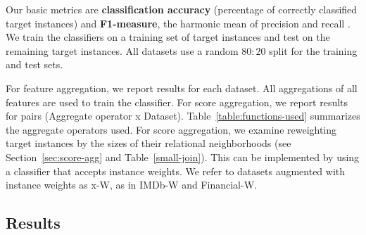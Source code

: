 \documentclass[conference]{IEEEtran}
\begin{document}
%



Our basic metrics are \textbf{classification accuracy} (percentage of correctly classified target instances) and \textbf{F1-measure}, the harmonic mean of precision and recall \cite{Witten2005}. We train the classifiers on a training set of target instances and test on the remaining target instances. All datasets use a random $80:20$ split for the training and test sets.

For feature aggregation, we report results for each dataset. All aggregations of all features are used to train the classifier. For score aggregation, we report results for pairs (Aggregate operator x Dataset). Table~\ref{table:functions-used} summarizes the aggregate operators used.
%
For score aggregation, we examine reweighting target instances by the sizes of their relational neighborhoods (see Section~\ref{sec:score-agg} and Table~\ref{small-join}). This can be %
implemented by using a classifier that accepts instance weights. We refer to datasets augmented with instance weights as x-W, as in IMDb-W and Financial-W.

\subsection{Results}
\end{document}
